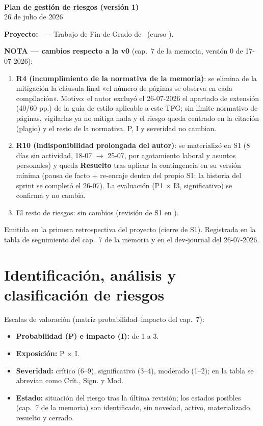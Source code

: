 \documentclass[11pt,a4paper]{article}
\begin{document}
\begin{center}
  {\Huge\bfseries\bukit}\\[0.5cm]
  {\Large\bfseries Plan de gestión de riesgos (versión 1)}\\[0.4cm]
  {\large 26 de julio de 2026}
\end{center}
\vspace{0.6cm}

\textbf{Proyecto:} \thesisTitle\ — Trabajo de Fin de Grado de \thesisAuthor\ (curso \thesisCourse).

\textbf{NOTA — cambios respecto a la v0} (cap.~7 de la memoria, versión 0 de 17-07-2026):
\begin{enumerate}
  \item \textbf{R4 (incumplimiento de la normativa de la memoria)}: se elimina de la mitigación la cláusula final «el número de páginas se observa en cada compilación».
  Motivo: el autor excluyó el 26-07-2026 el apartado de extensión (40/60 pp.) de la guía de estilo aplicable a este TFG; sin límite normativo de páginas, vigilarlas ya no mitiga nada y el riesgo queda centrado en la citación (plagio) y el resto de la normativa.
  P, I y severidad no cambian.
  \item \textbf{R10 (indisponibilidad prolongada del autor)}: se materializó en S1 (8 días sin actividad, 18-07 \(\to\) 25-07, por agotamiento laboral y asuntos personales) y queda \textbf{Resuelto} tras aplicar la contingencia en su versión mínima (pausa de facto + re-encaje dentro del propio S1; la historia del sprint se completó el 26-07).
  La evaluación (P1 \(\times\) I3, significativo) se confirma y no cambia.
  \item El resto de riesgos: sin cambios (revisión de S1 en ).
\end{enumerate}

Emitida en la primera retrospectiva del proyecto (cierre de S1).
Registrada en la tabla de seguimiento del cap.~7 de la memoria y en el dev-journal del 26-07-2026.

\section{Identificación, análisis y clasificación de riesgos}

Escalas de valoración (matriz probabilidad--impacto del cap.~7):
\begin{itemize}
  \item \textbf{Probabilidad (P) e impacto (I):} de 1 a 3.
  \item \textbf{Exposición:} P \(\times\) I.
  \item \textbf{Severidad:} crítico (6–9), significativo (3–4), moderado (1–2); en la tabla se abrevian como Crít., Sign. y Mod.
  \item \textbf{Estado:} situación del riesgo tras la última revisión; los estados posibles (cap.~7 de la memoria) son identificado, sin novedad, activo, materializado, resuelto y cerrado.
\end{itemize}
\end{document}
